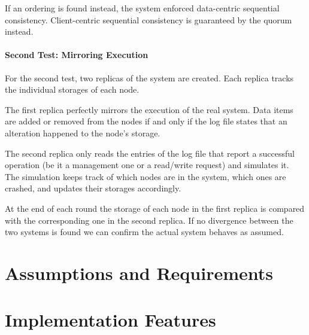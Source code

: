 \documentclass{article}
\begin{document}
If an ordering is found instead, the system enforced data-centric sequential consistency. Client-centric sequential consistency is guaranteed by the quorum instead.

\paragraph {Second Test: Mirroring Execution}
For the second test, two replicas of the system are created.
Each replica tracks the individual storages of each node.

The first replica perfectly mirrors the execution of the real system. Data items are added or removed from the nodes if and only if the log file states that an alteration happened to the node's storage.

The second replica only reads the entries of the log file that report a successful operation (be it a management one or a read/write request) and simulates it.\\
The simulation keeps track of which nodes are in the system, which ones are crashed, and updates their storages accordingly.

At the end of each round the storage of each node in the first replica is compared with the corresponding one in the second replica. If no divergence between the two systems is found we can confirm the actual system behaves as assumed.

\section{Assumptions and Requirements}

\section{Implementation Features}

\end{document}
